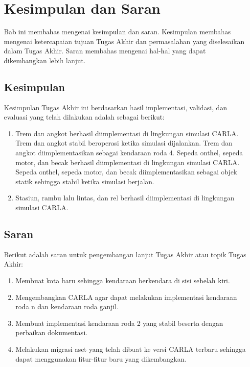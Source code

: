 \chapter{Kesimpulan dan Saran}

Bab ini membahas mengenai kesimpulan dan saran. Kesimpulan membahas mengenai
ketercapaian tujuan Tugas Akhir dan permasalahan yang diselesaikan dalam Tugas
Akhir. Saran membahas mengenai hal-hal yang dapat dikembangkan lebih lanjut.

\section{Kesimpulan}

Kesimpulan Tugas Akhir ini berdasarkan hasil implementasi, validasi, dan
evaluasi yang telah dilakukan adalah sebagai berikut:

\begin{enumerate}
	\item Trem dan angkot berhasil diimplementasi di lingkungan simulasi CARLA.
	Trem dan angkot stabil beroperasi ketika simulasi dijalankan. Trem dan
	angkot diimplementasikan sebagai kendaraan roda 4. Sepeda onthel, sepeda
	motor, dan becak berhasil diimplementasi di lingkungan simulasi CARLA.
	Sepeda onthel, sepeda motor, dan becak diimplementasikan sebagai objek
	statik sehingga stabil ketika simulasi berjalan.

	\item Stasiun, rambu lalu lintas, dan rel berhasil diimplementasi di
	lingkungan simulasi CARLA.


\end{enumerate}

\section{Saran}

Berikut adalah saran untuk pengembangan lanjut Tugas Akhir atau topik Tugas
Akhir:

\begin{enumerate}
	\item Membuat kota baru sehingga kendaraan berkendara di sisi sebelah kiri.
	\item Mengembangkan CARLA agar dapat melakukan implementasi kendaraan roda
	n dan kendaraan roda ganjil.
	\item Membuat implementasi kendaraan roda 2 yang stabil beserta dengan
	perbaikan dokumentasi.
	\item Melakukan migrasi aset yang telah dibuat ke versi CARLA terbaru
	sehingga dapat menggunakan fitur-fitur baru yang dikembangkan.
\end{enumerate}
